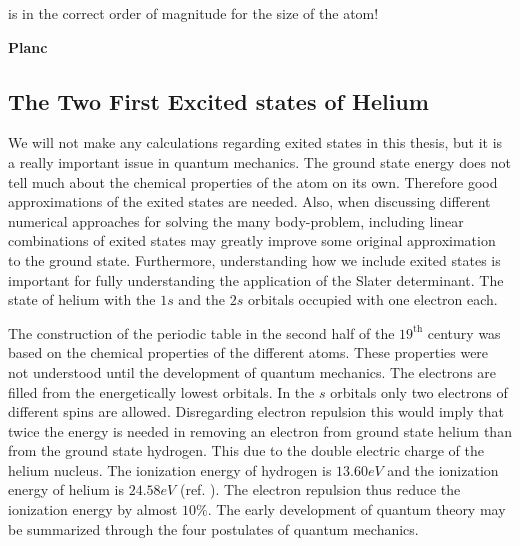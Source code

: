 is in the correct order of magnitude for the size of the atom!

{\bf Planc }





\subsection{The Two First Excited states of Helium}

We will not make any calculations regarding exited states in this
thesis, but it is a really important issue in quantum mechanics. The
ground state energy does not tell much about the 
chemical properties of the atom on its own. Therefore good
approximations of the exited states are needed. Also, when discussing
different numerical approaches for solving the many body-problem,
including linear combinations of exited states may greatly improve
some original approximation to the ground state. Furthermore,
understanding how we include exited states is important for fully
understanding the application of the Slater determinant.
\newline
%
\newline
The state of helium with the $1s$ and the $2s$ orbitals occupied
with one electron each. 








The construction of the
periodic table in the second half of the $19^{\mathrm{th}}$ century
was based on the chemical properties of the different atoms. These
properties were not understood until the development of quantum
mechanics. The electrons are filled from the energetically lowest
orbitals. In the $s$ orbitals only two electrons of different
spins are allowed. Disregarding electron repulsion this would imply
that twice the energy is needed in removing an electron from ground
state helium than from the ground state hydrogen. This due to the 
double electric charge of the helium nucleus. The ionization energy of
hydrogen is $13.60 eV$ and the ionization energy of helium is $24.58
eV$ (ref. \cite{atkins2003}). The electron repulsion thus reduce the
ionization energy by almost $10\%$.
\newline
%
\newline
The early development of quantum theory may be summarized through the
four postulates of quantum mechanics.


